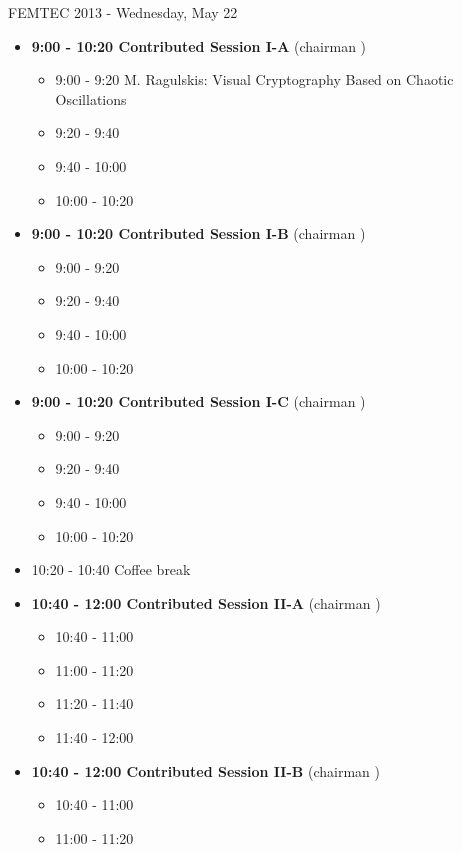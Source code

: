 \documentclass[10pt, A4]{article}%
\begin{document}
\newpage

\centerline{\huge FEMTEC 2013 - Wednesday, May 22}
\vspace{4mm}

\begin{itemize}    
  \item {\bf 9:00 - 10:20 Contributed Session I-A} (chairman ) 
  \begin{itemize}
    \item 9:00 - 9:20 {M. Ragulskis}: {Visual Cryptography Based on Chaotic Oscillations}
    \item 9:20 - 9:40 
    \item 9:40 - 10:00 
    \item 10:00 - 10:20  
  \end{itemize}
  \item {\bf 9:00 - 10:20 Contributed Session I-B} (chairman ) 
  \begin{itemize}
    \item 9:00 - 9:20 
    \item 9:20 - 9:40 
    \item 9:40 - 10:00 
    \item 10:00 - 10:20      
  \end{itemize}
    \item {\bf 9:00 - 10:20 Contributed Session I-C} (chairman ) 
  \begin{itemize}
    \item 9:00 - 9:20 
    \item 9:20 - 9:40 
    \item 9:40 - 10:00 
    \item 10:00 - 10:20      
  \end{itemize}
  \item 10:20 - 10:40 Coffee break
  \item {\bf 10:40 - 12:00 Contributed Session II-A} (chairman ) 
  \begin{itemize}
    \item 10:40 - 11:00
    \item 11:00 - 11:20 
    \item 11:20 - 11:40 
    \item 11:40 - 12:00 
  \end{itemize}
  \item {\bf 10:40 - 12:00 Contributed Session II-B} (chairman ) 
  \begin{itemize}
    \item 10:40 - 11:00
    \item 11:00 - 11:20 

\end{itemize}
\end{itemize}
\end{document}
